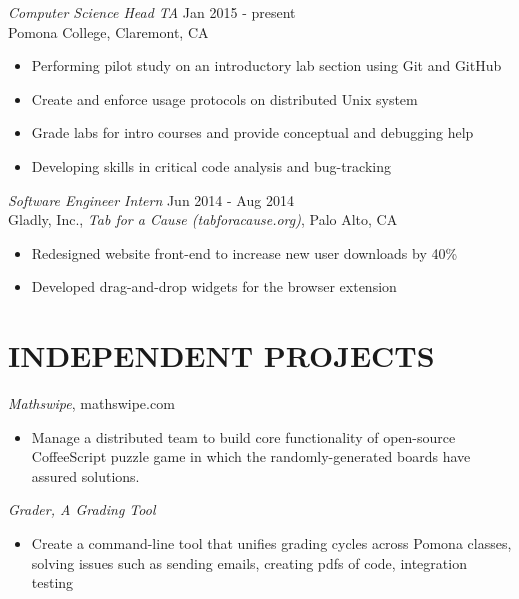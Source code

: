 \documentclass[margin, 10pt]{res} %
\begin{document}
\begin{resume}
{\sl Computer Science Head TA} \hfill Jan 2015 - present \\
Pomona College, Claremont, CA
\begin{itemize} \itemsep -2pt %
\item Performing pilot study on an introductory lab section using Git and GitHub
\item Create and enforce usage protocols on distributed Unix system
\item Grade labs for intro courses and provide conceptual and debugging help
\item Developing skills in critical code analysis and bug-tracking
\end{itemize}

{\sl Software Engineer Intern} \hfill Jun 2014 - Aug 2014 \\
Gladly, Inc., \textit{Tab for a Cause (tabforacause.org)}, Palo Alto, CA 
\begin{itemize} \itemsep -2pt %
\item Redesigned website front-end to increase new user downloads by 40\%
\item Developed drag-and-drop widgets for the browser extension
\end{itemize}



\section{INDEPENDENT PROJECTS}
{\sl Mathswipe}, mathswipe.com 
\begin{itemize} \itemsep -2pt %
\item Manage a distributed team to build core functionality of open-source CoffeeScript puzzle game in which the randomly-generated boards have assured solutions.
\end{itemize}

{\sl Grader, A Grading Tool}
\begin{itemize} \itemsep -2pt %
\item Create a command-line tool that unifies grading cycles across Pomona classes, solving issues such as sending emails, creating pdfs of code, integration testing
\end{itemize}


\end{resume}
\end{document}
